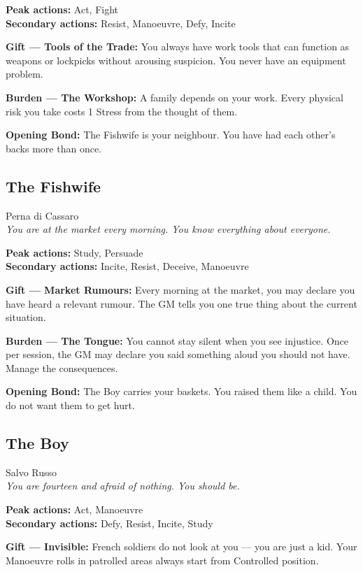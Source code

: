 \textbf{Peak actions:} Act, Fight\\
\textbf{Secondary actions:} Resist, Manoeuvre, Defy, Incite

\textbf{Gift --- Tools of the Trade:} You always have work tools
that can function as weapons or lockpicks without arousing suspicion.
You never have an equipment problem.

\textbf{Burden --- The Workshop:} A family depends on your work.
Every physical risk you take costs 1 Stress from the thought of them.

\textbf{Opening Bond:} The Fishwife is your neighbour.
You have had each other's backs more than once.

\filetto

\subsection{The Fishwife}
{\cinzel\footnotesize\color{grigionote} Perna di Cassaro}\\
\textit{You are at the market every morning. You know everything about everyone.}

\textbf{Peak actions:} Study, Persuade\\
\textbf{Secondary actions:} Incite, Resist, Deceive, Manoeuvre

\textbf{Gift --- Market Rumours:} Every morning at the market, you
may declare you have heard a relevant rumour. The GM tells you one
true thing about the current situation.

\textbf{Burden --- The Tongue:} You cannot stay silent when you see
injustice. Once per session, the GM may declare you said something
aloud you should not have. Manage the consequences.

\textbf{Opening Bond:} The Boy carries your baskets.
You raised them like a child. You do not want them to get hurt.

\filetto

\subsection{The Boy}
{\cinzel\footnotesize\color{grigionote} Salvo Russo}\\
\textit{You are fourteen and afraid of nothing. You should be.}

\textbf{Peak actions:} Act, Manoeuvre\\
\textbf{Secondary actions:} Defy, Resist, Incite, Study

\textbf{Gift --- Invisible:} French soldiers do not look at you —
you are just a kid. Your Manoeuvre rolls in patrolled areas always
start from Controlled position.

